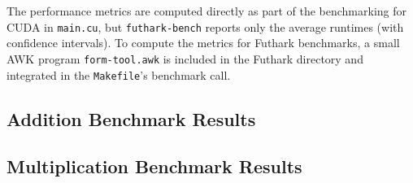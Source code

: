 The performance metrics are computed directly as part of the benchmarking for
CUDA in \texttt{main.cu}, but \texttt{futhark-bench} reports only the average
runtimes (with confidence intervals). To compute the metrics for Futhark
benchmarks, a small AWK program \texttt{form-tool.awk} is included in the
Futhark directory and integrated in the \texttt{Makefile}'s benchmark call.

\subsection{Addition Benchmark Results}
\label{subsec:benchres}

\subsection{Multiplication Benchmark Results}
\label{subsec:benchres}

